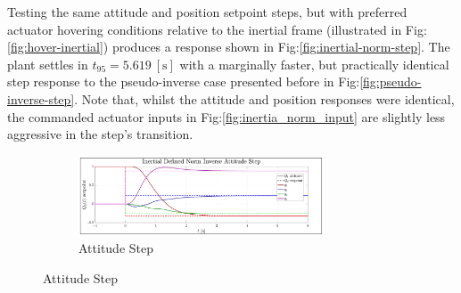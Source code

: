 Testing the same attitude and position setpoint steps, but with preferred actuator hovering conditions relative to the inertial frame (illustrated in Fig:\ref{fig:hover-inertial}) produces a response shown in Fig:\ref{fig:inertial-norm-step}. The plant settles in $t_{95}=5.619~[\text{s}]$ with a marginally faster, but practically identical step response to the pseudo-inverse case presented before in Fig:\ref{fig:pseudo-inverse-step}. Note that, whilst the attitude and position responses were identical, the commanded actuator inputs in Fig:\ref{fig:inertia_norm_input} are slightly less aggressive in the step's transition.
\begin{figure}[hbtp]
\vspace{-8pt}
\centering
\begin{subfigure}{\textwidth}
\centering
\includegraphics[width=0.8\textwidth]{graphs/inertial_norm_attitude}
\vspace{-6pt}
\caption{Attitude Step}
\label{fig:inertial_norm_attitude}
\end{subfigure}
\end{figure}
\newpage

